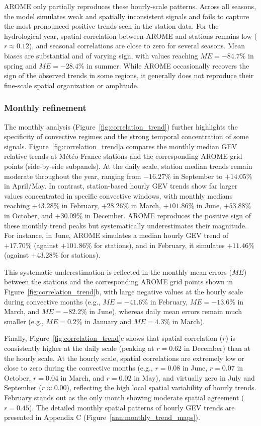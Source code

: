 \documentclass[hess, manuscript]{copernicus}
\begin{document}
AROME only partially reproduces these hourly-scale patterns. Across all seasons, the model simulates weak and spatially inconsistent signals and fails to capture the most pronounced positive trends seen in the station data. For the hydrological year, spatial correlation between AROME and stations remains low ($r \approx 0.12$), and seasonal correlations are close to zero for several seasons. Mean biases are substantial and of varying sign, with values reaching $ME = -84.7\%$ in spring and $ME = -28.4\%$ in summer. While AROME occasionally recovers the sign of the observed trends in some regions, it generally does not reproduce their fine-scale spatial organization or amplitude.

\subsubsection{Monthly refinement}

The monthly analysis (Figure~\ref{fig:correlation_trend}) further highlights the specificity of convective regimes and the strong temporal concentration of some signals. Figure~\ref{fig:correlation_trend}a compares the monthly median GEV relative trends at Météo-France stations and the corresponding AROME grid points (side-by-side subpanels). At the daily scale, station median trends remain moderate throughout the year, ranging from $-16.27\%$ in September to $+14.05\%$ in April/May. In contrast, station-based hourly GEV trends show far larger values concentrated in specific convective windows, with monthly medians reaching $+43.28\%$ in February, $+28.26\%$ in March, $+101.86\%$ in June, $+53.88\%$ in October, and $+30.09\%$ in December. AROME reproduces the positive sign of these monthly trend peaks but systematically underestimates their magnitude. For instance, in June, AROME simulates a median hourly GEV trend of $+17.70\%$ (against $+101.86\%$ for stations), and in February, it simulates $+11.46\%$ (against $+43.28\%$ for stations).

This systematic underestimation is reflected in the monthly mean errors ($ME$) between the stations and the corresponding AROME grid points shown in Figure~\ref{fig:correlation_trend}b, with large negative values at the hourly scale during convective months (e.g., $ME = -41.6\%$ in February, $ME = -13.6\%$ in March, and $ME = -82.2\%$ in June), whereas daily mean errors remain much smaller (e.g., $ME = 0.2\%$ in January and $ME = 4.3\%$ in March).

Finally, Figure~\ref{fig:correlation_trend}c shows that spatial correlation ($r$) is consistently higher at the daily scale (peaking at $r = 0.62$ in December) than at the hourly scale. At the hourly scale, spatial correlations are extremely low or close to zero during the convective months (e.g., $r = 0.08$ in June, $r = 0.07$ in October, $r = 0.04$ in March, and $r = 0.02$ in May), and virtually zero in July and September ($r \approx 0.00$), reflecting the high local spatial variability of hourly trends. February stands out as the only month showing moderate spatial agreement ($r = 0.45$). The detailed monthly spatial patterns of hourly GEV trends are presented in Appendix C (Figure~\ref{ann:monthly_trend_maps}).
\end{document}
